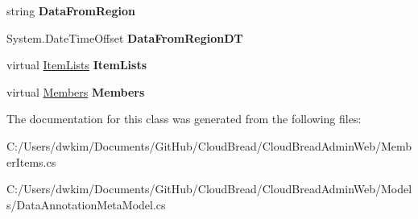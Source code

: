 \begin{DoxyCompactItemize}
\item 
string {\bfseries Data\+From\+Region}\hypertarget{class_cloud_bread_admin_web_1_1_member_items_a7b0db173fa9c09d5f313f4405408c765}{}\label{class_cloud_bread_admin_web_1_1_member_items_a7b0db173fa9c09d5f313f4405408c765}

\item 
System.\+Date\+Time\+Offset {\bfseries Data\+From\+Region\+DT}\hypertarget{class_cloud_bread_admin_web_1_1_member_items_a041f3c91fb3ec279849e23ec7d773fd8}{}\label{class_cloud_bread_admin_web_1_1_member_items_a041f3c91fb3ec279849e23ec7d773fd8}

\item 
virtual \hyperlink{class_cloud_bread_admin_web_1_1_item_lists}{Item\+Lists} {\bfseries Item\+Lists}\hypertarget{class_cloud_bread_admin_web_1_1_member_items_a017771c56a3c232e0cbcf74979460808}{}\label{class_cloud_bread_admin_web_1_1_member_items_a017771c56a3c232e0cbcf74979460808}

\item 
virtual \hyperlink{class_cloud_bread_admin_web_1_1_members}{Members} {\bfseries Members}\hypertarget{class_cloud_bread_admin_web_1_1_member_items_a6b8658b26d732c25cb45a76443c12523}{}\label{class_cloud_bread_admin_web_1_1_member_items_a6b8658b26d732c25cb45a76443c12523}

\end{DoxyCompactItemize}


The documentation for this class was generated from the following files\+:\begin{DoxyCompactItemize}
\item 
C\+:/\+Users/dwkim/\+Documents/\+Git\+Hub/\+Cloud\+Bread/\+Cloud\+Bread\+Admin\+Web/Member\+Items.\+cs\item 
C\+:/\+Users/dwkim/\+Documents/\+Git\+Hub/\+Cloud\+Bread/\+Cloud\+Bread\+Admin\+Web/\+Models/Data\+Annotation\+Meta\+Model.\+cs\end{DoxyCompactItemize}
